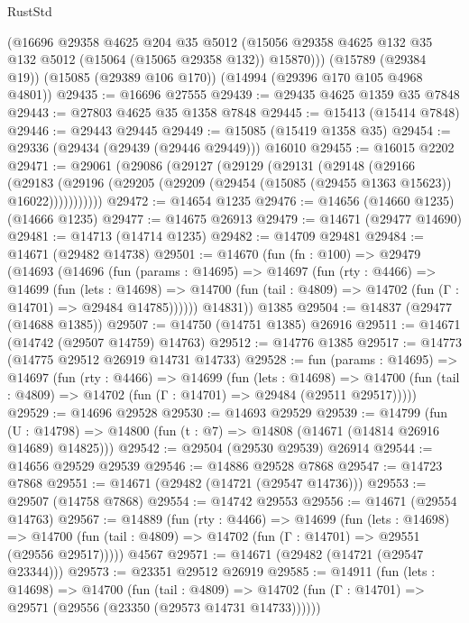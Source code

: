 \begin{lexlean}{RustStd}
\begin{coremodule}
      (@16696
        @29358
        @4625
        @204
        @35
        @5012
        (@15056 @29358 @4625 @132 @35 @132 @5012 (@15064 (@15065 @29358 @132)) @15870)))
    (@15789 (@29384 @19))
    (@15085 (@29389 @106 @170))
    (@14994 (@29396 @170 @105 @4968 @4801))
@29435 := @16696 @27555
@29439 := @29435 @4625 @1359 @35 @7848
@29443 := @27803 @4625 @35 @1358 @7848
@29445 := @15413 (@15414 @7848)
@29446 := @29443 @29445
@29449 := @15085 (@15419 @1358 @35)
@29454 := @29336 (@29434 (@29439 (@29446 @29449))) @16010
@29455 := @16015 @2202
@29471 := @29061
    (@29086
      (@29127
        (@29129
          (@29131
            (@29148
              (@29166
                (@29183
                  (@29196 (@29205 (@29209 (@29454 (@15085 (@29455 @1363 @15623)) @16022)))))))))))
@29472 := @14654 @1235
@29476 := @14656 (@14660 @1235) (@14666 @1235)
@29477 := @14675 @26913
@29479 := @14671 (@29477 @14690)
@29481 := @14713 (@14714 @1235)
@29482 := @14709 @29481
@29484 := @14671 (@29482 @14738)
@29501 := @14670
    (fun (fn : @100) =>
    @29479
      (@14693
        (@14696
          (fun (params : @14695) =>
          @14697
            (fun (rty : @4466) =>
            @14699
              (fun (lets : @14698) =>
              @14700 (fun (tail : @4809) => @14702 (fun (Γ : @14701) => @29484 @14785))))))
        @14831))
    @1385
@29504 := @14837 (@29477 (@14688 @1385))
@29507 := @14750 (@14751 @1385) @26916
@29511 := @14671 (@14742 (@29507 @14759) @14763)
@29512 := @14776 @1385
@29517 := @14773 (@14775 @29512 @26919 @14731 @14733)
@29528 := fun (params : @14695) =>
  @14697
    (fun (rty : @4466) =>
    @14699
      (fun (lets : @14698) =>
      @14700 (fun (tail : @4809) => @14702 (fun (Γ : @14701) => @29484 (@29511 @29517)))))
@29529 := @14696 @29528
@29530 := @14693 @29529
@29539 := @14799
    (fun (U : @14798) => @14800 (fun (t : @7) => @14808 (@14671 (@14814 @26916 @14689) @14825)))
@29542 := @29504 (@29530 @29539) @26914
@29544 := @14656 @29529 @29539
@29546 := @14886 @29528 @7868
@29547 := @14723 @7868
@29551 := @14671 (@29482 (@14721 (@29547 @14736)))
@29553 := @29507 (@14758 @7868)
@29554 := @14742 @29553
@29556 := @14671 (@29554 @14763)
@29567 := @14889
    (fun (rty : @4466) =>
    @14699
      (fun (lets : @14698) =>
      @14700 (fun (tail : @4809) => @14702 (fun (Γ : @14701) => @29551 (@29556 @29517)))))
    @4567
@29571 := @14671 (@29482 (@14721 (@29547 @23344)))
@29573 := @23351 @29512 @26919
@29585 := @14911
    (fun (lets : @14698) =>
    @14700
      (fun (tail : @4809) =>
      @14702 (fun (Γ : @14701) => @29571 (@29556 (@23350 (@29573 @14731 @14733))))))

\end{coremodule}
\end{lexlean}
